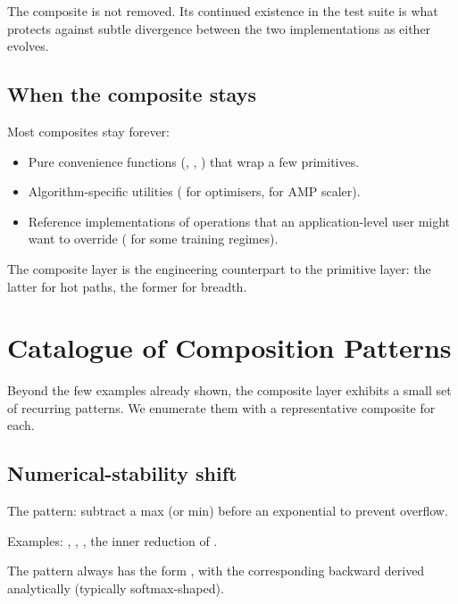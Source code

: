 The composite is not removed. Its continued existence in the test
suite is what protects against subtle divergence between the two
implementations as either evolves.

\subsection{When the composite stays}
\label{ssec:composite_ops:composite_stays}

Most composites stay forever:

\begin{itemize}
  \item Pure convenience functions (,
    , ) that wrap a few
    primitives.
  \item Algorithm-specific utilities ( for
    optimisers,  for AMP
    scaler).
  \item Reference implementations of operations that an
    application-level user might want to override
    ( for some training
    regimes).
\end{itemize}

The composite layer is the engineering counterpart to the
primitive layer: the latter for hot paths, the former for
breadth.

\section{Catalogue of Composition Patterns}
\label{sec:composite_ops:catalogue}

Beyond the few examples already shown, the composite layer
exhibits a small set of recurring patterns. We enumerate them with
a representative composite for each.

\subsection{Numerical-stability shift}
\label{ssec:composite_ops:numerical_shift}

The pattern: subtract a max (or min) before an exponential to
prevent overflow.

Examples: , , ,
the inner reduction of .

The pattern always has the form
, with the corresponding
backward derived analytically (typically softmax-shaped).

